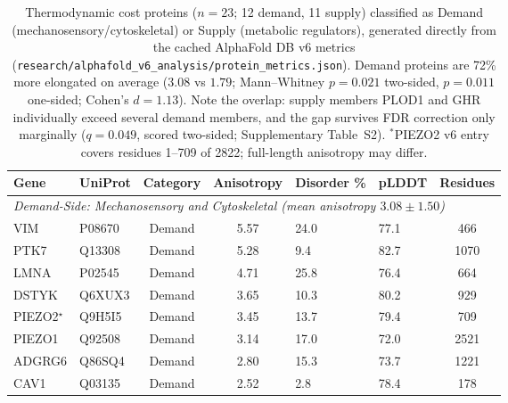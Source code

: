\begin{table}[h!]
\centering
\caption{Thermodynamic cost proteins ($n=23$; 12 demand, 11 supply) classified as Demand (mechanosensory/cytoskeletal) or Supply (metabolic regulators), generated directly from the cached AlphaFold DB v6 metrics (\texttt{research/alphafold\_v6\_analysis/protein\_metrics.json}). Demand proteins are 72\% more elongated on average ($3.08$ vs $1.79$; Mann--Whitney $p = 0.021$ two-sided, $p = 0.011$ one-sided; Cohen's $d = 1.13$). Note the overlap: supply members PLOD1 and GHR individually exceed several demand members, and the gap survives FDR correction only marginally ($q = 0.049$, scored two-sided; Supplementary Table~S2). $^*$PIEZO2 v6 entry covers residues 1--709 of 2822; full-length anisotropy may differ.}
\label{tab:thermodynamic_cost_proteins}
\scriptsize
\begin{tabular}{llccllc}
\toprule
\textbf{Gene} & \textbf{UniProt} & \textbf{Category} & \textbf{Anisotropy} & \textbf{Disorder \%} & \textbf{pLDDT} & \textbf{Residues} \\
\midrule
\multicolumn{7}{l}{\textit{Demand-Side: Mechanosensory and Cytoskeletal (mean anisotropy $3.08 \pm 1.50$)}} \\
VIM & P08670 & Demand & 5.57 & 24.0 & 77.1 & 466 \\
PTK7 & Q13308 & Demand & 5.28 & 9.4 & 82.7 & 1070 \\
LMNA & P02545 & Demand & 4.71 & 25.8 & 76.4 & 664 \\
DSTYK & Q6XUX3 & Demand & 3.65 & 10.3 & 80.2 & 929 \\
PIEZO2$^{\star}$ & Q9H5I5 & Demand & 3.45 & 13.7 & 79.4 & 709 \\
PIEZO1 & Q92508 & Demand & 3.14 & 17.0 & 72.0 & 2521 \\
ADGRG6 & Q86SQ4 & Demand & 2.80 & 15.3 & 73.7 & 1221 \\
CAV1 & Q03135 & Demand & 2.52 & 2.8 & 78.4 & 178 \\

\end{tabular}
\end{table}
